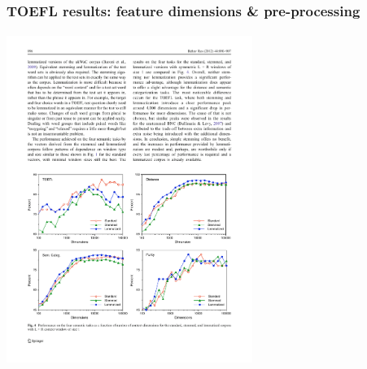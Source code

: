 \documentclass[t]{beamer} %
\begin{document}
\begin{frame}
  \frametitle{TOEFL results: feature dimensions \& pre-processing}
  \framesubtitle{\citep[p.~895, Fig.~4]{Bullinaria:Levy:12}}

  \ungap[1]
  \begin{center}
    \includegraphics[width=8cm]{img/BullinariaLevy2012_p895_fig4_TOEFL_dim_stem}
  \end{center}

  \ungap[.5]
\end{frame}
\end{document}
